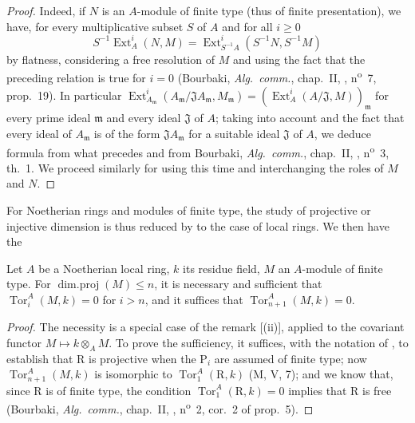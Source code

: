 \begin{proof}
Indeed, if $N$ is an $A$-module of finite type (thus of finite presentation), we have, for every multiplicative subset $S$ of $A$ and for all $i\geq 0$
\[
  S^{-1}\operatorname{Ext}^i_A(N,M)=\operatorname{Ext}^i_{S^{-1}\!A}(S^{-1}N,S^{-1}M)
\]
by flatness, considering a free resolution of $M$ and using the fact that the preceding relation is true for $i=0$ (Bourbaki, \emph{Alg.~comm.}, chap.~II, , n\textsuperscript{o}~7, prop.~19).
In particular $\operatorname{Ext}^i_{A_\mathfrak{m}}(A_\mathfrak{m}/\mathfrak{J}A_\mathfrak{m},M_\mathfrak{m})=(\operatorname{Ext}^i_A(A/\mathfrak{J},M))_\mathfrak{m}$ for every prime ideal $\mathfrak{m}$ and every ideal $\mathfrak{J}$ of $A$;
taking into account  and the fact that every ideal of $A_\mathfrak{m}$ is of the form $\mathfrak{J}A_\mathfrak{m}$ for a suitable ideal $\mathfrak{J}$ of $A$, we deduce formula  from what precedes and from Bourbaki, \emph{Alg.~comm.}, chap.~II, , n\textsuperscript{o}~3, th.~1.
We proceed similarly for  using this time  and interchanging the roles of $M$ and $N$.
\end{proof}

For Noetherian rings and modules of finite type, the study of projective or injective dimension is thus reduced by  to the case of local rings.
We then have the

\begin{lemma}[17.2.6]
\label{0.17.2.6}
Let $A$ be a Noetherian local ring, $k$ its residue field, $M$ an $A$-module of finite type.
For $\operatorname{dim.proj}(M)\leq n$, it is necessary and sufficient that $\operatorname{Tor}^A_i(M,k)=0$ for $i>n$, and it suffices that $\operatorname{Tor}^A_{n+1}(M,k)=0$.
\end{lemma}

\begin{proof}
The necessity is a special case of the remark [(ii)], applied to the covariant functor $M\mapsto k\otimes_A M$.
To prove the sufficiency, it suffices, with the notation of , to establish that $\mathrm{R}$ is projective when the $\mathrm{P}_i$ are assumed of finite type;
now $\operatorname{Tor}^A_{n+1}(M,k)$ is isomorphic to $\operatorname{Tor}^A_1(\mathrm{R},k)$ (M, V, 7);
and we know that, since $\mathrm{R}$ is of finite type, the condition $\operatorname{Tor}^A_1(\mathrm{R},k)=0$ implies that $\mathrm{R}$ is free (Bourbaki, \emph{Alg.~comm.}, chap.~II, , n\textsuperscript{o}~2, cor.~2 of prop.~5).
\end{proof}

